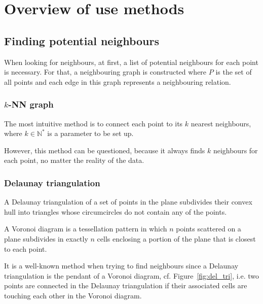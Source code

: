 \documentclass[lettersize,journal,english]{IEEEtran}
\begin{document}
\section{Overview of use methods\label{sec:overview}}
    \subsection{Finding potential neighbours}
        When looking for neighbours, at first, a list of potential neighbours for each point is necessary.
        For that, a neighbouring graph is constructed where $P$ is the set of all points and each edge in this graph represents a neighbouring relation.

        \subsubsection{$k$-NN graph}
            The most intuitive method is to connect each point to its $k$ nearest neighbours, where $k \in \mathbb{N}^*$ is a parameter to be set up. 

            However, this method can be questioned, because it always finds $k$ neighbours for each point, no matter the reality of the data.

        \subsubsection{Delaunay triangulation}
            A Delaunay triangulation \cite{art_delaunay} of a set of points in the plane subdivides their convex hull into triangles whose circumcircles do not contain any of the points.

            A Voronoi diagram is a tessellation pattern in which $n$ points scattered on a plane subdivides in exactly $n$ cells enclosing a portion of the plane that is closest to each point. 

            It is a well-known method when trying to find neighbours \cite{delaunay_neighbor} since a Delaunay triangulation is the pendant of a Voronoi diagram, cf. Figure~\ref{fig:del_tri}, i.e. two points are connected in the
            Delaunay triangulation if their associated cells are touching each other in the Voronoi diagram.
\end{document}
